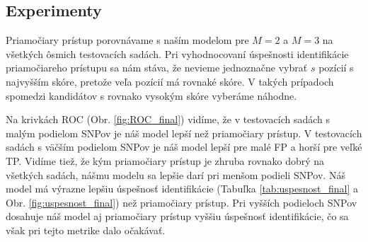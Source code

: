 \subsection{Experimenty}

Priamočiary prístup porovnávame s naším modelom pre $M=2$ a $M=3$ na všetkých ôsmich testovacích sadách.
Pri vyhodnocovaní úspešnosti identifikácie priamočiareho prístupu sa nám stáva, že nevieme jednoznačne
vybrať $s$ pozícií s najvyšším skóre, pretože veľa pozícií má rovnaké skóre. V takých prípadoch spomedzi
kandidátov s rovnako vysokým skóre vyberáme náhodne. 

Na krivkách ROC (Obr. \ref{fig:ROC_final}) vidíme, že v testovacích sadách s malým podielom SNPov je
náš model lepší než priamočiary prístup. V testovacích sadách s väčším podielom SNPov je náš model lepší
pre malé FP a horší pre veľké TP. Vidíme tiež, že kým priamočiary prístup je zhruba rovnako dobrý na
všetkých sadách, nášmu modelu sa lepšie darí pri menšom podieli SNPov. Náš model má výrazne lepšiu 
úspešnosť identifikácie (Tabuľka \ref{tab:uspesnost_final} a Obr. \ref{fig:uspesnost_final}) než priamočiary
prístup. Pri vyšších podieloch SNPov dosahuje náš model aj priamočiary prístup vyššiu
úspešnosť identifikácie, čo sa však pri tejto metrike dalo očakávať.
 

